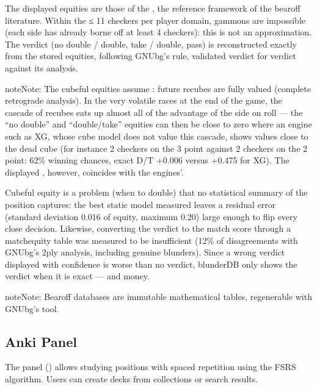 \documentclass[letterpaper,10pt,english]{sphinxmanual}
\begin{document}
\sphinxAtStartPar
{} The displayed equities are those of the , the reference framework of the bearoff literature. Within the ≤ 11 checkers per player domain, gammons are impossible (each side has already borne off at least 4 checkers): this is not an approximation. The verdict (no double / double, take / double, pass) is reconstructed exactly from the stored equities, following GNUbg’s rule, validated verdict for verdict against its analysis.

\begin{sphinxadmonition}{note}{Note:}
\sphinxAtStartPar
The cubeful equities assume : future recubes are fully valued (complete retrograde analysis). In the very volatile races at the end of the game, the cascade of recubes eats up almost all of the advantage of the side on roll — the “no double” and “double/take” equities can then be close to zero where an engine such as XG, whose cube model does not value this cascade, shows values close to the dead cube (for instance 2 checkers on the 3 point against 2 checkers on the 2 point: 62\% winning chances, exact D/T +0.006 versus +0.475 for XG). The displayed , however, coincides with the engines’.
\end{sphinxadmonition}

\sphinxAtStartPar
{} Cubeful equity is a  problem (when to double) that no statistical summary of the position captures: the best static model measured leaves a residual error (standard deviation 0.016 of equity, maximum 0.20) large enough to flip every close decision. Likewise, converting the verdict to the match score through a match\sphinxhyphen{}equity table was measured to be insufficient (12\% of disagreements with GNUbg’s 2\sphinxhyphen{}ply analysis, including genuine blunders). Since a wrong verdict displayed with confidence is worse than no verdict, blunderDB only shows the verdict when it is exact — and money.

\begin{sphinxadmonition}{note}{Note:}
\sphinxAtStartPar
Bearoff databases are immutable mathematical tables, regenerable with GNUbg’s  tool.
\end{sphinxadmonition}


\subsection{Anki Panel}
\label{\detokenize{manuel:panneau-anki}}\label{\detokenize{manuel:id10}}
\sphinxAtStartPar
The  panel () allows studying positions with spaced repetition using the FSRS algorithm. Users can create decks from collections or search results.
\end{document}
